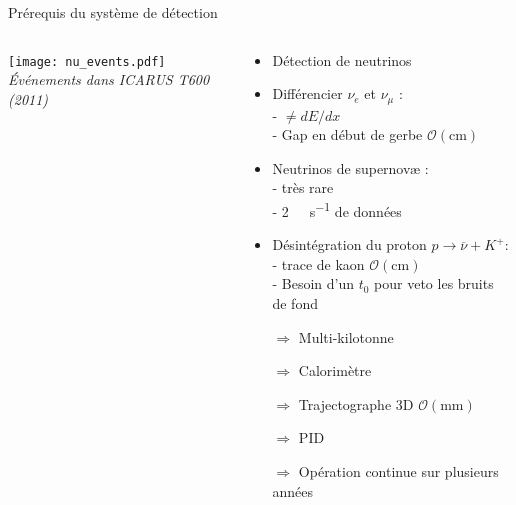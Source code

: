     \begin{frame}{Prérequis du système de détection}
        \begin{scriptsize}
            \begin{columns}
                \begin{column}{0.5\textwidth}
                    \texttt{[image: nu\_events.pdf]}\\\textit{Événements dans ICARUS T600 (2011)}
                \end{column}
                 \begin{column}{0.5\textwidth}
                    \begin{itemize}
                        \item Détection de neutrinos
                        \item Différencier $\nu_e$ et $\nu_{\mu}$ : \\ - $\neq dE/dx$ \\ - Gap en début de gerbe $\mathcal{O}(\si{\centi\meter})$
                        \item Neutrinos de supernovæ : \\ - très rare \\ - \SI{2}{\tera\byte\per\second} de données
                        \item Désintégration du proton $p\to \overline{\nu} + K^+$: \\ - trace de kaon $\mathcal{O}(\si{\centi\meter})$ \\ - Besoin d'un $t_0$ pour veto les bruits de fond
                    \end{itemize}
                    \begin{itemize}
                        \item[$\Rightarrow$] Multi-kilotonne
                        \item[$\Rightarrow$] Calorimètre
                        \item[$\Rightarrow$] Trajectographe 3D $\mathcal{O}(\si{\milli\meter})$
                        \item[$\Rightarrow$] PID
                        \item[$\Rightarrow$] Opération continue sur plusieurs années
                    \end{itemize}
                \end{column}
            \end{columns}
        \end{scriptsize}
    \end{frame}
                    
